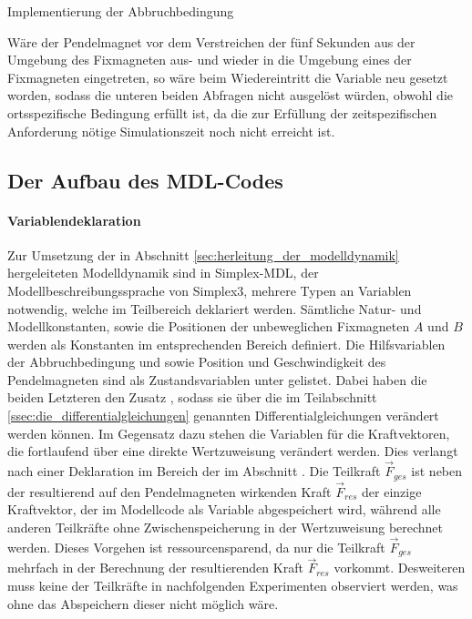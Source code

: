 \begin{code*}
	
	\caption{Implementierung der Abbruchbedingung}
	\label{code:implementierung_der_abbruchbedingung}
\end{code*}
Wäre der Pendelmagnet vor dem Verstreichen der fünf Sekunden aus der Umgebung des Fixmagneten aus- und wieder in die Umgebung eines der Fixmagneten eingetreten, so wäre beim Wiedereintritt die Variable  neu gesetzt worden, sodass die unteren beiden Abfragen nicht ausgelöst würden, obwohl die ortsspezifische Bedingung erfüllt ist, da die zur Erfüllung der  zeitspezifischen Anforderung nötige Simulationszeit  noch nicht erreicht ist.

\subsection{Der Aufbau des MDL-Codes}
\label{ssec:der_aufbau_des_mdl-codes}

\paragraph{Variablendeklaration} Zur Umsetzung der in Abschnitt \ref{sec:herleitung_der_modelldynamik} hergeleiteten Modelldynamik sind in Simplex-MDL, der Modellbeschreibungssprache von Simplex3, mehrere Typen an Variablen notwendig, welche im Teilbereich  deklariert werden. Sämtliche Natur- und Modellkonstanten, sowie die Positionen der unbeweglichen Fixmagneten $A$ und $B$ werden als Konstanten im entsprechenden Bereich  definiert. Die Hilfsvariablen der Abbruchbedingung  und  sowie Position und Geschwindigkeit des Pendelmagneten sind als Zustandsvariablen unter  gelistet. Dabei haben die beiden Letzteren den Zusatz , sodass sie über die im Teilabschnitt \ref{ssec:die_differentialgleichungen} genannten Differentialgleichungen verändert werden können. Im Gegensatz dazu stehen die Variablen für die Kraftvektoren, die fortlaufend über eine direkte Wertzuweisung verändert werden. Dies verlangt nach einer Deklaration im Bereich der  im Abschnitt . Die Teilkraft $\vec{F}_{ges}$ ist neben der resultierend auf den Pendelmagneten wirkenden Kraft $\vec{F}_{res}$ der einzige Kraftvektor, der im Modellcode als Variable abgespeichert wird, während alle anderen Teilkräfte ohne Zwischenspeicherung in der Wertzuweisung berechnet werden. Dieses Vorgehen ist ressourcensparend, da nur die Teilkraft $\vec{F}_{ges}$ mehrfach in der Berechnung der resultierenden Kraft $\vec{F}_{res}$ vorkommt. Desweiteren muss keine der Teilkräfte in nachfolgenden Experimenten observiert werden, was ohne das Abspeichern dieser nicht möglich wäre.


